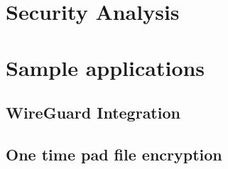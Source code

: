 \documentclass{paper}
\begin{document}
		
		\section{Security Analysis}
		\section{Sample applications}
			\subsection{WireGuard Integration}
			\subsection{One time pad file encryption}
		
						
\end{document}
